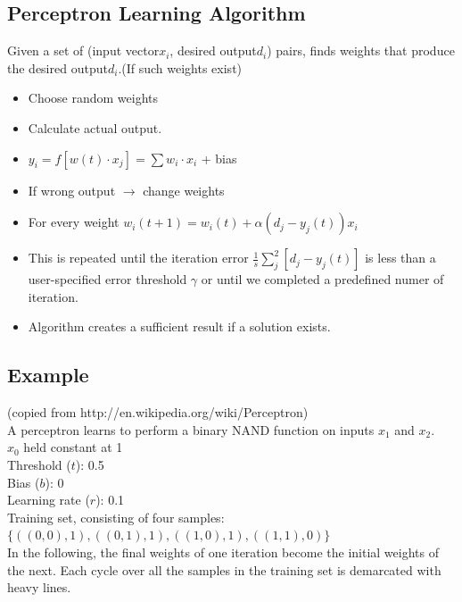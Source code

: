 \documentclass[english,11pt]{article}
\begin{document}
\subsection{Perceptron Learning Algorithm}
Given a set of (input vector$x_i$, desired output$d_i$) pairs, finds weights that produce the desired output$d_i$.(If such weights exist)\\
\begin{itemize}
\item Choose random weights
\item Calculate actual output.
\item $y_i = f[w(t)\cdot x_j] = \sum w_i \cdot x_i$ + bias
\item If wrong output $\rightarrow$ change weights
\item For every weight $w_i(t+1) = w_i(t) + \alpha(d_j-y_j(t))x_i$
\item This is repeated until the iteration error $\frac{1}{s}\sum_j^2[d_j-y_j(t)]$ is less than a user-specified error threshold $\gamma$ or until we completed a predefined numer of iteration.
\item Algorithm creates a sufficient result if a solution exists.
\end{itemize}

\subsection*{Example}
(copied from http://en.wikipedia.org/wiki/Perceptron)\\
A perceptron learns to perform a binary NAND function on inputs $x_1$ and $x_2$.\\ $x_0$ held constant at 1\\
Threshold ($t$): 0.5\\Bias ($b$): 0\\Learning rate ($r$): 0.1\\
Training set, consisting of four samples:$\{ ((0,0),1),((0,1),1),((1,0),1),((1,1),0) \}$\\
In the following, the final weights of one iteration become the initial weights of the next. Each cycle over all the samples in the training set is demarcated with heavy lines.\\
\end{document}
